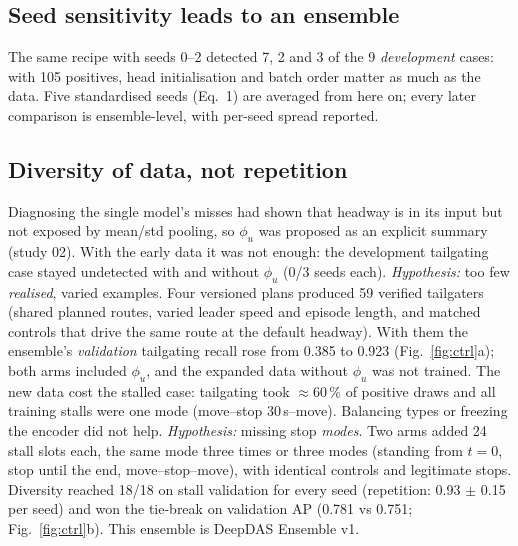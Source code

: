 \documentclass[10pt,a4paper,twocolumn]{article}
\newcommand{\EDIV}{DeepDAS Ensemble v1}\newcommand{\dev}{\textit{development}}\newcommand{\val}{\textit{validation}}\newcommand{\ft}{\textit{final test}}
\begin{document}
\subsection{Seed sensitivity leads to an ensemble}
The same recipe with seeds 0--2 detected 7, 2 and 3 of the 9 \dev{} cases: with 105 positives, head initialisation and batch order matter as much as the data. Five standardised seeds (Eq.~1) are averaged from here on; every later comparison is ensemble-level, with per-seed spread reported.

\subsection{Diversity of data, not repetition}
Diagnosing the single model's misses had shown that headway is in its input but not exposed by mean/std pooling, so $\phi_u$ was proposed as an explicit summary (study 02). With the early data it was not enough: the development tailgating case stayed undetected with and without $\phi_u$ (0/3 seeds each). \emph{Hypothesis:} too few \emph{realised}, varied examples. Four versioned plans produced 59 verified tailgaters (shared planned routes, varied leader speed and episode length, and matched controls that drive the same route at the default headway). With them the ensemble's \val{} tailgating recall rose from 0.385 to 0.923 (Fig.~\ref{fig:ctrl}a); both arms included $\phi_u$, and the expanded data without $\phi_u$ was not trained. The new data cost the stalled case: tailgating took $\approx$60\,\% of positive draws and all training stalls were one mode (move--stop 30\,s--move). Balancing types or freezing the encoder did not help. \emph{Hypothesis:} missing stop \emph{modes}. Two arms added 24 stall slots each, the same mode three times or three modes (standing from $t=0$, stop until the end, move--stop--move), with identical controls and legitimate stops. Diversity reached 18/18 on stall validation for every seed (repetition: 0.93 $\pm$ 0.15 per seed) and won the tie-break on validation AP (0.781 vs 0.751; Fig.~\ref{fig:ctrl}b). This ensemble is \EDIV.
\end{document}
